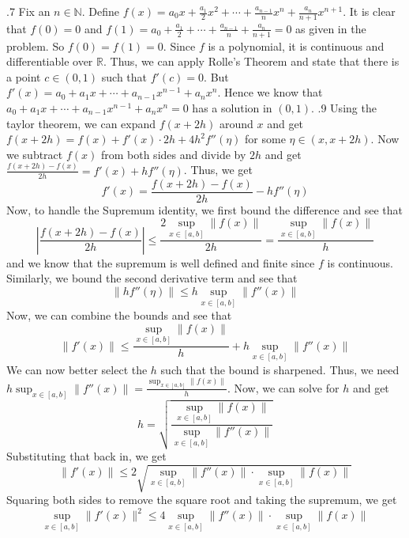 \documentclass[12pt]{exam}
\begin{document}
\begin{questions}
.7\newline
Fix an $n \in \mathbb{N}$. Define $f(x) = a_0x+\frac{a_1}2x^2+\cdots+\frac{a_{n-1}}nx^{n}+\frac{a_n}{n+1}x^{n+1}$. It is clear that $f(0) = 0$ and $f(1) =  a_0+\frac{a_1}2+\cdots+\frac{a_{n-1}}n+\frac{a_n}{n+1} = 0$ as given in the problem. So $f(0) = f(1) = 0$. Since $f$ is a polynomial, it is continuous and differentiable over $\mathbb{R}$. Thus, we can apply Rolle's Theorem and state that there is a point $c \in (0,1)$ such that $f'(c) = 0$. But $f'(x) = a_0+a_1x+\cdots+a_{n-1}x^{n-1}+a_nx^{n}$. Hence we know that $a_0+a_1x+\cdots+a_{n-1}x^{n-1}+a_nx^{n}=0$ has a solution in $(0,1)$. 
.9\newline
Using the taylor theorem, we can expand $f(x+2h)$ around $x$ and get $f(x+2h)=f(x)+f'(x)\cdot 2h+4h^2f''(\eta)$ for some $\eta \in (x,x+2h)$. Now we subtract $f(x)$ from both sides and divide by $2h$ and get $\frac{f(x+2h)-f(x)}{2h}=f'(x)+hf''(\eta)$. Thus, we get \[f'(x)=\frac{f(x+2h)-f(x)}{2h}-hf''(\eta)\] Now, to handle the Supremum identity, we first bound the difference and see that \[\left|\frac{f(x+2h)-f(x)}{2h} \right|\leq \frac{2\sup_{x\in[a,b]}\|f(x)\|}{2h} = \frac{\sup_{x\in[a,b]}\|f(x)\|}{h}\] and we know that the supremum is well defined and finite since $f$ is continuous. Similarly, we bound the second derivative term and see that \[\|hf''(\eta)\| \leq h\sup_{x\in[a,b]}\|f''(x)\|\] Now, we can combine the bounds and see that \[\|f'(x)\|\leq \frac{\sup_{x\in[a,b]}\|f(x)\|}{h}+h\sup_{x\in[a,b]}\|f''(x)\|\] We can now better select the $h$ such that the bound is sharpened. Thus, we need $h\sup_{x\in[a,b]}\|f''(x)\|=\frac{\sup_{x\in[a,b]}\|f(x)\|}{h}$. Now, we can solve for $h$ and get \[h = \sqrt{\frac{\sup_{x\in[a,b]}\|f(x)\|}{\sup_{x\in[a,b]}\|f''(x)\|}}\] Substituting that back in, we get 
\[\|f'(x)\| \leq 2\sqrt{\sup_{x\in[a,b]}\|f''(x)\|\cdot \sup_{x\in[a,b]}\|f(x)\|}\] Squaring both sides to remove the square root and taking the supremum, we get \[\sup_{x\in[a,b]}\|f'(x)\|^2 \leq 4\sup_{x\in[a,b]}\|f''(x)\|\cdot \sup_{x\in[a,b]}\|f(x)\|\]

\end{questions}
\end{document}
